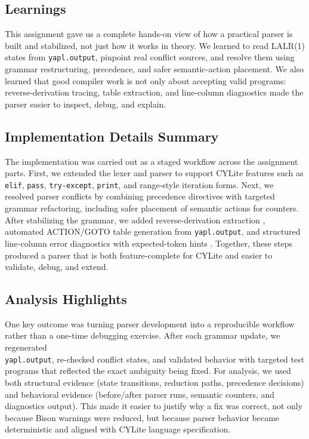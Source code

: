 \documentclass[a4paper,12pt]{article}
\begin{document}
\subsection{Learnings}

This assignment gave us a complete hands-on view of how a practical parser is built and stabilized, not just how it works in theory. We learned to read LALR(1) states from \texttt{yapl.output}, pinpoint real conflict sources, and resolve them using grammar restructuring, precedence, and safer semantic-action placement. We also learned that good compiler work is not only about accepting valid programs: reverse-derivation tracing, table extraction, and line-column diagnostics made the parser easier to inspect, debug, and explain.

\subsection{Implementation Details Summary}

The implementation was carried out as a staged workflow across the assignment parts. First, we extended the lexer and parser to support CYLite features such as \texttt{elif}, \texttt{pass}, \texttt{try-except}, \texttt{print}, and range-style iteration forms. Next, we resolved parser conflicts by combining precedence directives with targeted grammar refactoring, including safer placement of semantic actions for counters. After stabilizing the grammar, we added reverse-derivation extraction , automated ACTION/GOTO table generation from \texttt{yapl.output}, and structured line-column error diagnostics with expected-token hints . Together, these steps produced a parser that is both feature-complete for CYLite and easier to validate, debug, and extend.

\subsection{Analysis Highlights}

One key outcome was turning parser development into a reproducible workflow rather than a one-time debugging exercise. After each grammar update, we regenerated \\ \texttt{yapl.output}, re-checked conflict states, and validated behavior with targeted test programs that reflected the exact ambiguity being fixed. For analysis, we used both structural evidence (state transitions, reduction paths, precedence decisions) and behavioral evidence (before/after parser runs, semantic counters, and diagnostics output). This made it easier to justify why a fix was correct, not only because Bison warnings were reduced, but because parser behavior became deterministic and aligned with CYLite language specification.
\end{document}
